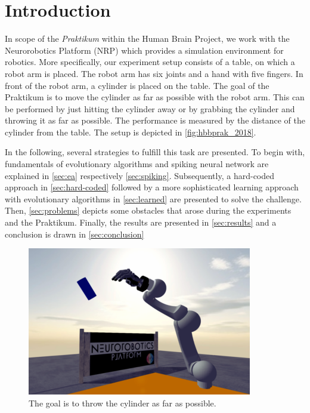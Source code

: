 \section{Introduction}
\label{sec:intro}
In scope of the \textit{Praktikum} within the Human Brain Project, we work with the Neurorobotics Platform (NRP) which provides a simulation environment for robotics.
More specifically, our experiment setup consists of a table, on which a robot arm is placed.
The robot arm has six joints and a hand with five fingers.
In front of the robot arm, a cylinder is placed on the table.
The goal of the Praktikum is to move the cylinder as far as possible with the robot arm.
This can be performed by just hitting the cylinder away or by grabbing the cylinder and throwing it as far as possible.
The performance is measured by the distance of the cylinder from the table.
The setup is depicted in \autoref{fig:hbbprak_2018}.

In the following, several strategies to fulfill this task are presented.
To begin with, fundamentals of evolutionary algorithms and spiking neural network are explained in \autoref{sec:ea} respectively \autoref{sec:spiking}.
Subsequently, a hard-coded approach in \autoref{sec:hard-coded} followed by a more sophisticated learning approach with evolutionary algorithms in \autoref{sec:learned} are presented to solve the challenge.
Then, \autoref{sec:problems} depicts some obstacles that arose during the experiments and the Praktikum.
Finally, the results are presented in \autoref{sec:results} and a conclusion is drawn in \autoref{sec:conclusion}

\begin{figure}[h]
\centering
\includegraphics[width=.95\columnwidth]{figures/hbpprak_2018.png}
\caption{The goal is to throw the cylinder as far as possible.}
\label{fig:hbbprak_2018}
\end{figure}